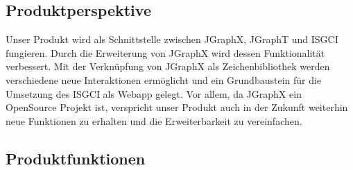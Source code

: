\documentclass[11pt,a4paper]{article}
\begin{document}
  	\subsection{Produktperspektive} %
	Unser Produkt wird als Schnittstelle zwischen JGraphX, JGraphT und ISGCI fungieren. Durch die Erweiterung von JGraphX wird dessen Funktionalität verbessert. Mit der Verknüpfung von JGraphX als Zeichenbibliothek werden verschiedene neue Interaktionen ermöglicht und ein Grundbaustein für die Umsetzung des ISGCI als Webapp gelegt. Vor allem, da JGraphX ein OpenSource Projekt ist, verspricht unser Produkt auch in der Zukunft weiterhin neue Funktionen zu erhalten und die Erweiterbarkeit zu vereinfachen.
  	\subsection{Produktfunktionen} %
  	
\end{document}
